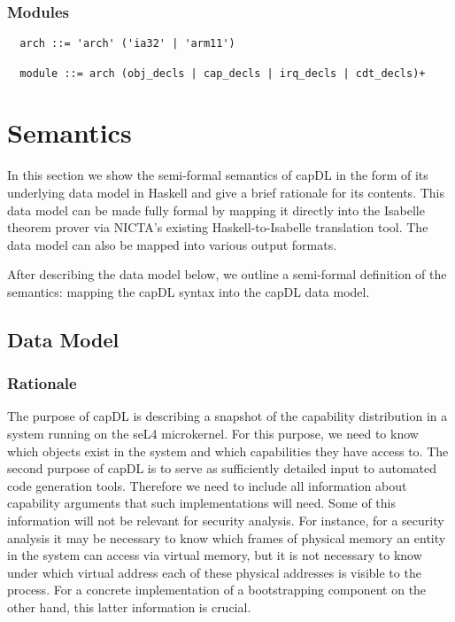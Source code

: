 \documentclass[a4paper,11pt]{article}
\begin{document}
\subsubsection{Modules}\label{sec:capDL:syntax:module}

\begin{verbatim}
  arch ::= 'arch' ('ia32' | 'arm11') 

  module ::= arch (obj_decls | cap_decls | irq_decls | cdt_decls)+
\end{verbatim}


\section{Semantics}
\label{sec:capDL:semantics}

In this section we show the semi-formal semantics of capDL in the form of its underlying data model in Haskell and give a brief rationale for its contents. This data model can be made fully formal by mapping it directly into the Isabelle theorem prover via NICTA's existing Haskell-to-Isabelle translation tool. The data model can also be mapped into various output formats. 

After describing the data model below, we outline a semi-formal definition of the semantics: mapping the capDL syntax into the capDL data model.


\subsection{Data Model}

\subsubsection{Rationale}
The purpose of capDL is describing a snapshot of the capability distribution in 
a system running on the seL4 microkernel. For this purpose, we need to know 
which objects exist in the system and which capabilities they have access to. 
The second purpose of capDL is to serve as sufficiently detailed input to 
automated code generation tools. Therefore we need to include all information 
about capability arguments that such implementations will need. Some of this 
information will not be relevant for security analysis. For instance, for a 
security analysis it may be necessary to know which frames of physical memory 
an entity in the system can access via virtual memory, but it is not necessary 
to know under which virtual address each of these physical addresses is visible 
to the process. For a concrete implementation of a bootstrapping component on 
the other hand, this latter information is crucial.
\end{document}
